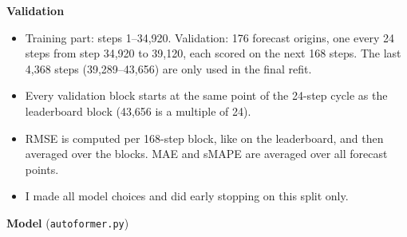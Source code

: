 \documentclass[10pt]{article}
\begin{document}
\textbf{Validation}
\begin{itemize}
\item Training part: steps 1--34,920. Validation: 176 forecast origins, one every 24 steps from step 34,920 to 39,120, each scored on the next 168 steps. The last 4,368 steps (39,289--43,656) are only used in the final refit.
\item Every validation block starts at the same point of the 24-step cycle as the leaderboard block (43,656 is a multiple of 24).
\item RMSE is computed per 168-step block, like on the leaderboard, and then averaged over the blocks. MAE and sMAPE are averaged over all forecast points.
\item I made all model choices and did early stopping on this split only.
\end{itemize}
\textbf{Model} (\texttt{autoformer.py})
\end{document}
